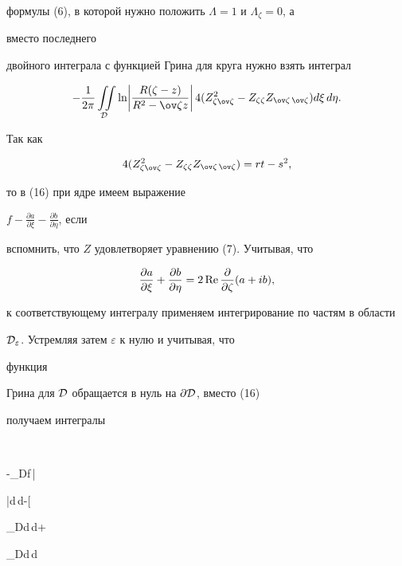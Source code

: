 формулы (6), в которой нужно положить $\Lambda=1$ и $\Lambda_\zeta=0$, а 


вместо последнего 


двойного интеграла с функцией Грина для круга нужно взять интеграл 


\begin{equation} 


-\frac{1}{2\pi}\iintl_{\cal D}\ln\biggl| 


\frac{R(\zeta-z)}{R^2-\ov\zeta z}\biggr|\,


4(Z^2_{\zeta\ov\zeta}-Z_{\zeta\zeta}Z_{\ov\zeta\,\ov\zeta}) 


d\xi\,d\eta. 


\end{equation} 


Так как 


$$ 


4(Z^2_{\zeta\ov\zeta}-Z_{\zeta\zeta}Z_{\ov\zeta\,\ov\zeta})= 


rt-s^2, 


$$ 


то в (16) при ядре имеем выражение 


$f-\frac{\partial a}{\partial\xi}-\frac{\partial b}{\partial\eta}$, если 


вспомнить, что $Z$ удовлетворяет уравнению (7). Учитывая, что 


$$ 


\frac{\partial a}{\partial\xi}+\frac{\partial b}{\partial\eta} 


=2\re\frac{\partial}{\partial\zeta}(a+ib), 


$$ 


к соответствующему интегралу применяем интегрирование по частям в области 


$\cal D_\varepsilon$. Устремляя затем $\varepsilon$ к нулю и учитывая, что 


функция 


Грина для $\cal D$ обращается в нуль на $\partial\cal D$, вместо (16) 


получаем интегралы 


$$ 


-\iintl_{\cal D}f\,\ln\biggl| 


\biggr|d\xi\,d\eta-\re\biggl[\, 


\iintl_{\cal D}d\xi\,d\eta+ 


\iintl_{\cal D}d\xi\,d\eta 


